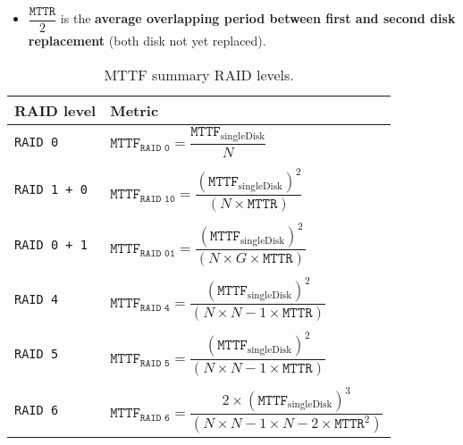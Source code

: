 \begin{itemize}
\begin{itemize}
\begin{itemize}
\begin{itemize}
                \item $\dfrac{\texttt{MTTR}}{2}$ is the \textbf{average overlapping period between first and second disk replacement} (both disk not yet replaced).
            \end{itemize}
        \end{itemize}
    \end{itemize}
\end{itemize}

\newpage

\begin{table}[!htp]
    \centering
    \begin{tabular}{@{} l l @{}}
        \toprule
        \textbf{RAID level} & \textbf{Metric} \\
        \midrule
        \texttt{RAID 0}     & $\texttt{MTTF}_{\texttt{RAID 0}} = \dfrac{\texttt{MTTF}_{\text{singleDisk}}}{N}$ \\ \\
        \texttt{RAID 1 + 0} & $\texttt{MTTF}_{\texttt{RAID 10}} = \dfrac{\left(\texttt{MTTF}_{\text{singleDisk}}\right)^{2}}{\left(N \times \texttt{MTTR}\right)}$ \\ \\
        \texttt{RAID 0 + 1} & $\texttt{MTTF}_{\texttt{RAID 01}} = \dfrac{\left(\texttt{MTTF}_{\text{singleDisk}}\right)^{2}}{\left(N \times G \times \texttt{MTTR}\right)}$ \\ \\
        \texttt{RAID 4}     & $\texttt{MTTF}_{\texttt{RAID 4}} = \dfrac{\left(\texttt{MTTF}_{\text{singleDisk}}\right)^{2}}{\left(N \times N-1 \times \texttt{MTTR}\right)}$ \\ \\
        \texttt{RAID 5}     & $\texttt{MTTF}_{\texttt{RAID 5}} = \dfrac{\left(\texttt{MTTF}_{\text{singleDisk}}\right)^{2}}{\left(N \times N-1 \times \texttt{MTTR}\right)}$ \\ \\
        \texttt{RAID 6}     & $\texttt{MTTF}_{\texttt{RAID 6}} = \dfrac{2 \times \left(\texttt{MTTF}_{\text{singleDisk}}\right)^{3}}{\left(N \times N-1 \times N-2 \times \texttt{MTTR}^{2}\right)}$ \\
        \bottomrule
    \end{tabular}
    \caption{MTTF summary RAID levels.}
\end{table}